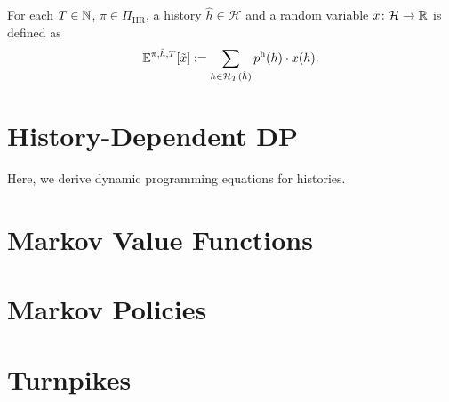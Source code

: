 \begin{definition}
  For each $T\in \mathbb{N}$, $\pi\in \Pi_{\mathrm{HR}}$, a history $\hat{h}\in \mathcal{H}$ and a random variable $\tilde{x}\colon \mathcal{H} \to \mathbb{R}$ is defined as
  \[
   \mathbb{E}^{\pi, \hat{h}, T} [\tilde{x}]  := \sum_{h\in \mathcal{H}_T(\hat{h})} p^{\mathrm{h}}(h) \cdot x(h).
 \]
 \lean{}
\end{definition}

\section{History-Dependent DP}

Here, we derive dynamic programming equations for histories.

\section{Markov Value Functions}


\section{Markov Policies}

\section{Turnpikes}


